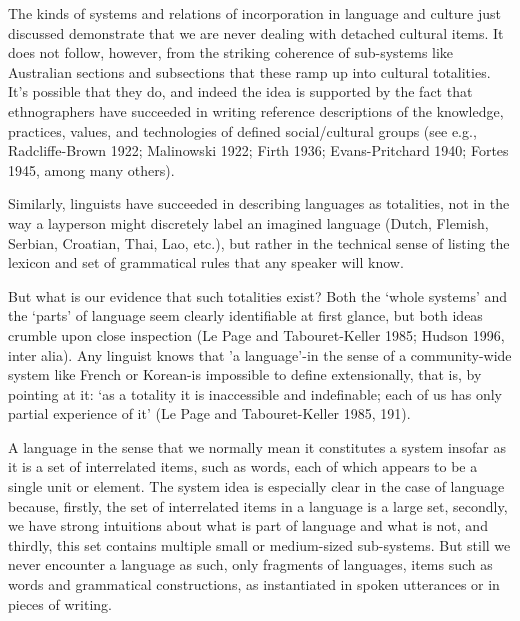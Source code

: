 The kinds of systems and relations of incorporation in language and 
culture just discussed demonstrate that we are never dealing with 
detached cultural items. It does not follow, however, from the striking 
coherence of sub-systems like Australian sections and subsections that 
these ramp up into cultural totalities. It's possible that they do, and 
indeed the idea is supported by the fact that ethnographers have 
succeeded in writing reference descriptions of the knowledge, practices, 
values, and technologies of defined social/cultural groups (see e.g., 
Radcliffe-Brown 1922; Malinowski 1922; Firth 1936; Evans-Pritchard 1940; 
Fortes 1945, among many others). 



Similarly, linguists have succeeded in describing languages as 
totalities, not in the way a layperson might discretely label an 
imagined language (Dutch, Flemish, Serbian, Croatian, Thai, Lao, etc.), 
but rather in the technical sense of listing the lexicon and set of 
grammatical rules that any speaker will know. 



But what is our evidence that such totalities exist? Both the \textquoteleft whole 
systems' and the \textquoteleft parts' of language seem clearly identifiable at first 
glance, but both ideas crumble upon close inspection (Le Page and 
Tabouret-Keller 1985; Hudson 1996, inter alia). Any linguist knows that 
'a language'-in the sense of a community-wide system like French or 
Korean-is impossible to define extensionally, that is, by pointing at 
it: \textquoteleft as a totality it is inaccessible and indefinable; each of us has 
only partial experience of it' (Le Page and Tabouret-Keller 1985, 191). 



A language in the sense that we normally mean it constitutes a system 
insofar as it is a set of interrelated items, such as words, each of 
which appears to be a single unit or element. The system idea is 
especially clear in the case of language because, firstly, the set of 
interrelated items in a language is a large set, secondly, we have 
strong intuitions about what is part of language and what is not, and 
thirdly, this set contains multiple small or medium-sized sub-systems. 
But still we never encounter a language as such, only fragments of 
languages, items such as words and grammatical constructions, as 
instantiated in spoken utterances or in pieces of writing. 



